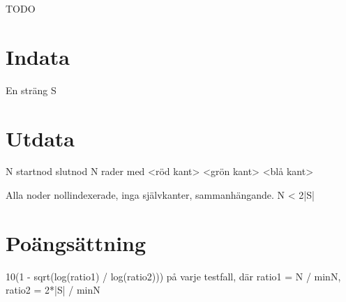 \def\version{1}
TODO

\section*{Indata}
En sträng S

\section*{Utdata}
N startnod slutnod
N rader med <röd kant> <grön kant> <blå kant>

Alla noder nollindexerade, inga självkanter, sammanhängande.
N < 2|S|

\section*{Poängsättning}
10(1 - sqrt(log(ratio1) / log(ratio2))) på varje testfall, där ratio1 = N / minN, ratio2 = 2*|S| / minN
